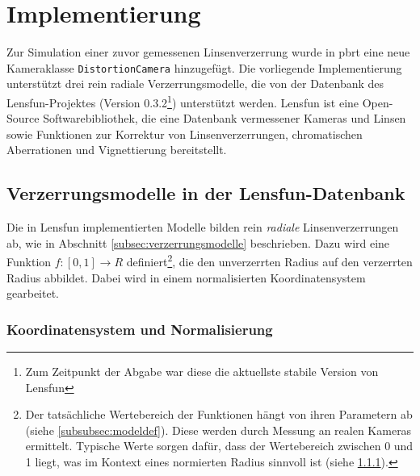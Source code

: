 \newpage
\section{Implementierung}

Zur Simulation einer zuvor gemessenen Linsenverzerrung wurde in pbrt eine neue Kameraklasse \texttt{DistortionCamera} hinzugefügt. Die vorliegende Implementierung unterstützt drei rein radiale Verzerrungsmodelle, die von der Datenbank des Lensfun-Projektes\cite{lensfun_basic} (Version 0.3.2\footnote{Zum Zeitpunkt der Abgabe war diese die aktuellste stabile Version von Lensfun}) unterstützt werden. Lensfun ist eine Open-Source Softwarebibliothek, die eine Datenbank vermessener Kameras und Linsen sowie Funktionen zur Korrektur von Linsenverzerrungen, chromatischen Aberrationen und Vignettierung bereitstellt.

\subsection{Verzerrungsmodelle in der Lensfun-Datenbank}

Die in Lensfun implementierten Modelle bilden rein \emph{radiale} Linsenverzerrungen ab, wie in Abschnitt \ref{subsec:verzerrungsmodelle} beschrieben. Dazu wird eine Funktion $f:[0,1] \rightarrow R$ definiert\footnote{Der tatsächliche Wertebereich der Funktionen hängt von ihren Parametern ab (siehe \ref{subsubsec:modeldef}). Diese werden durch Messung an realen Kameras ermittelt. Typische Werte sorgen dafür, dass der Wertebereich zwischen 0 und 1 liegt, was im Kontext eines normierten Radius sinnvoll ist (siehe \ref{subsubsec:norm_radius}).}, die den unverzerrten Radius auf den verzerrten Radius abbildet. Dabei wird in einem normalisierten Koordinatensystem gearbeitet.

\subsubsection{Koordinatensystem und Normalisierung}
\label{subsubsec:norm_radius}

